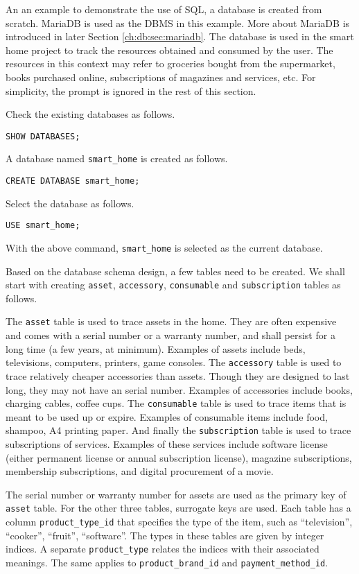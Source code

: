 An an example to demonstrate the use of SQL, a database is created from scratch. MariaDB is used as the DBMS in this example. More about MariaDB is introduced in later Section \ref{ch:db:sec:mariadb}. The database is used in the smart home project to track the resources obtained and consumed by the user. The resources in this context may refer to groceries bought from the supermarket, books purchased online, subscriptions of magazines and services, etc. For simplicity, the prompt is ignored in the rest of this section.

Check the existing databases as follows.
\begin{lstlisting}
SHOW DATABASES;
\end{lstlisting}
A database named \verb|smart_home| is created as follows.
\begin{lstlisting}
CREATE DATABASE smart_home;
\end{lstlisting}
Select the database as follows.
\begin{lstlisting}
USE smart_home;
\end{lstlisting}
With the above command, \verb|smart_home| is selected as the current database.

Based on the database schema design, a few tables need to be created. We shall start with creating \verb|asset|, \verb|accessory|, \verb|consumable| and \verb|subscription| tables as follows.

The \verb|asset| table is used to trace assets in the home. They are often expensive and comes with a serial number or a warranty number, and shall persist for a long time (a few years, at minimum). Examples of assets include beds, televisions, computers, printers, game consoles. The \verb|accessory| table is used to trace relatively cheaper accessories than assets. Though they are designed to last long, they may not have an serial number. Examples of accessories include books, charging cables, coffee cups. The \verb|consumable| table is used to trace items that is meant to be used up or expire. Examples of consumable items include food, shampoo, A4 printing paper. And finally the \verb|subscription| table is used to trace subscriptions of services. Examples of these services include software license (either permanent license or annual subscription license), magazine subscriptions, membership subscriptions, and digital procurement of a movie.

The serial number or warranty number for assets are used as the primary key of \verb|asset| table. For the other three tables, surrogate keys are used. Each table has a column \verb|product_type_id| that specifies the type of the item, such as ``television'', ``cooker'', ``fruit'', ``software''. The types in these tables are given by integer indices. A separate \verb|product_type| relates the indices with their associated meanings. The same applies to \verb|product_brand_id| and \verb|payment_method_id|.

